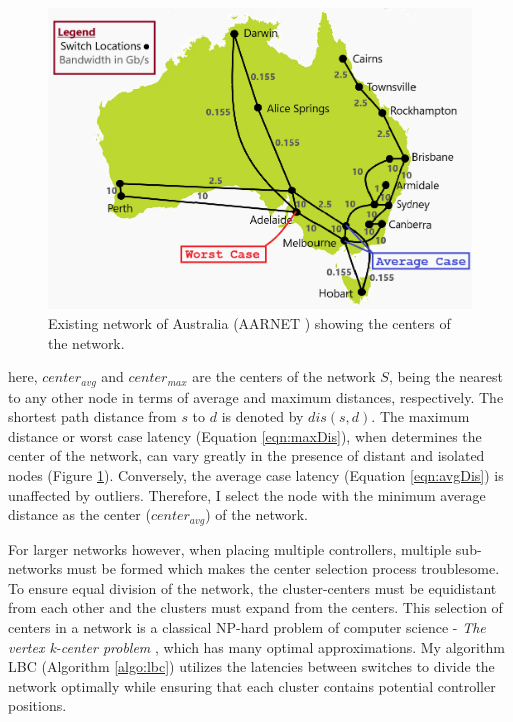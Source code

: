 \documentclass[preprint,12pt]{elsarticle}
\begin{document}
	\begin{figure}
		\centering
		\includegraphics[width=0.85\linewidth]{Images/Aarnet.png}
		\caption{Existing network of Australia (AARNET \cite{knight2011internet}) showing the centers of the network.}
		\label{fig:aarnetcc}
	\end{figure}
	
	here, $center_{avg}$ and $center_{max}$ are the centers of the network $S$, being the nearest to any other node in terms of average and maximum distances, respectively. The shortest path distance from $s$ to $d$ is denoted by $dis(s,d)$. The maximum distance or worst case latency (Equation \ref{eqn:maxDis}), when determines the center of the network, can vary greatly in the presence of distant and isolated nodes (Figure \ref{fig:aarnetcc}). Conversely, the average case latency (Equation \ref{eqn:avgDis}) is unaffected by outliers. Therefore, I select the node with the minimum average distance as the center ($center_{avg}$) of the network.
	
	For larger networks however, when placing multiple controllers, multiple sub-networks must be formed which makes the center selection process troublesome. To ensure equal division of the network, the cluster-centers must be equidistant from each other and the clusters must expand from the centers. This selection of centers in a network is a classical NP-hard problem of computer science - \textit{The vertex k-center problem} \cite{kariv1979algorithmic}, which has many optimal approximations. My algorithm LBC (Algorithm \ref{algo:lbc}) utilizes the latencies between switches to divide the network optimally while ensuring that each cluster contains potential controller positions.
	
\end{document}
